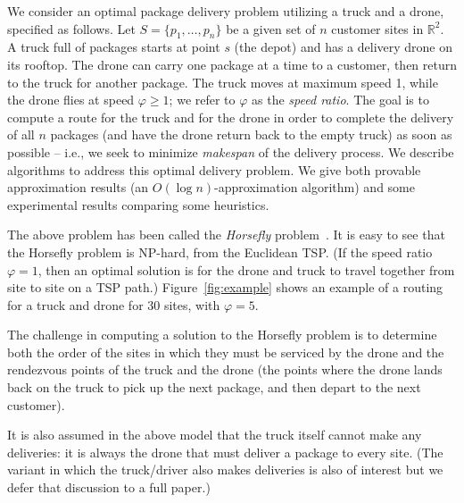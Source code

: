\documentclass[conference]{IEEEtran}
\newcommand{\old}[1]{{}}
\begin{document}
We consider an optimal package delivery problem utilizing a truck and
a drone, specified as follows.  Let $S=\{p_1,\ldots,p_n\}$ be a given
set of $n$ customer sites in $\mathbb{R}^2$. A truck full of packages
starts at point $s$ (the depot) and has a delivery drone on its
rooftop. The drone can carry one package at a time to a customer, then
return to the truck for another package.  The truck moves at maximum
speed 1, while the drone flies at speed $\varphi\geq 1$; we refer to
$\varphi$ as the {\em speed ratio}.  The goal is to compute a route
for the truck and for the drone in order to complete the delivery of
all $n$ packages (and have the drone return back to the empty truck)
as soon as possible -- i.e., we seek to minimize {\em makespan} of the
delivery process.  We describe algorithms to address this optimal
delivery problem. We give both provable approximation results (an
$O(\log n)$-approximation algorithm) and some experimental results
comparing some heuristics.

The above problem has been called the \textit{Horsefly}
problem~\cite{john}.  It is easy to see that the Horsefly problem is
NP-hard, from the Euclidean TSP. (If the speed ratio $\varphi=1$, then
an optimal solution is for the drone and truck to travel together from
site to site on a TSP path.)
Figure~\ref{fig:example} shows an example of a routing for a truck and drone
for 30 sites, with $\varphi = 5$.

The challenge in computing a solution to the Horsefly problem is to
determine both the order of the sites in which they must be serviced
by the drone and the rendezvous points of the truck and the drone (the
points where the drone lands back on the truck to pick up the next
package, and then depart to the next customer).

It is also assumed in the above model that the truck itself cannot
make any deliveries: it is always the drone that must deliver a
package to every site. (The variant in which the truck/driver also
makes deliveries is also of interest but we defer that discussion to a
full paper.)

\old{
  The Horsefly problem is a direct generalization of the TSP-path problem: if 
\(\varphi = 1\), both the routes of the truck and the drone co-incide with
the TSP-path tour. Since the TSP itself is NP-hard, so is the horsefly problem.}
\end{document}
